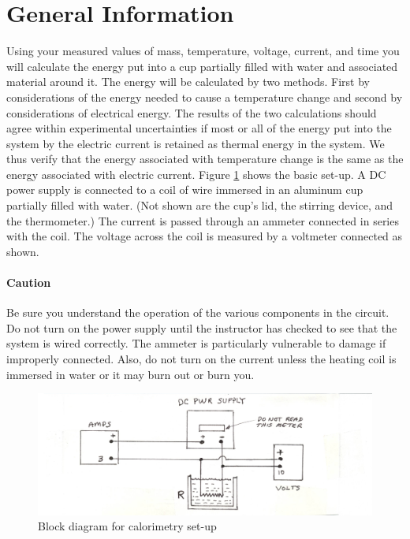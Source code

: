 \section{General Information}
Using your measured values of mass, temperature, voltage, current, and time you will calculate the energy put into a cup partially filled with water and associated material around it.  The energy will be calculated by two methods.  First by considerations of the energy needed to cause a temperature change and second by considerations of electrical energy.  The results of the two calculations should agree within experimental uncertainties if most or all of the energy put into the system by the electric current is retained as thermal energy in the system.  We thus verify that the energy associated with temperature change is the same as the energy associated with electric current. 
Figure \ref{f:fig2} shows the basic set-up.  A DC power supply is connected to a coil of wire immersed in an aluminum cup partially filled with water.  (Not shown are the cup's lid, the stirring device, and the thermometer.)  The current is passed through an ammeter connected in series with the coil.  The voltage across the coil is measured by a voltmeter connected as shown.  
\paragraph{Caution}
Be sure you understand the operation of the various components in the circuit.  Do not turn on the power supply until the instructor has checked to see that the system is wired correctly.  The ammeter is particularly vulnerable to damage if improperly connected.  Also, do not turn on the current unless the heating coil is immersed in water or it may burn out or burn you.

\begin{figure}
	\centering
	\includegraphics[scale=0.8]{5bgraf/fig_2}
	\caption{Block diagram for calorimetry set-up}
	\label{f:fig2}
\end{figure}


